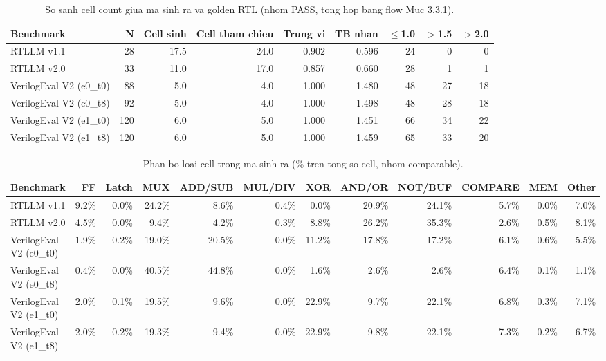 \begin{table}[htbp]
    \centering
    \caption{So sanh cell count giua ma sinh ra va golden RTL (nhom PASS, tong hop bang flow Muc 3.3.1).}
    \label{tab:cell-bloat-summary}
    \begin{tabular}{lrrrrrrrr}
        \toprule
        \textbf{Benchmark} & \textbf{N} & \textbf{Cell sinh} & \textbf{Cell tham chieu} & \textbf{Trung vi} & \textbf{TB nhan} & \textbf{$\leq$1.0} & \textbf{$>$1.5} & \textbf{$>$2.0} \\
        \midrule
        RTLLM v1.1 & 28 & 17.5 & 24.0 & 0.902 & 0.596 & 24 & 0 & 0 \\
        RTLLM v2.0 & 33 & 11.0 & 17.0 & 0.857 & 0.660 & 28 & 1 & 1 \\
        VerilogEval V2 (e0_t0) & 88 & 5.0 & 4.0 & 1.000 & 1.480 & 48 & 27 & 18 \\
        VerilogEval V2 (e0_t8) & 92 & 5.0 & 4.0 & 1.000 & 1.498 & 48 & 28 & 18 \\
        VerilogEval V2 (e1_t0) & 120 & 6.0 & 5.0 & 1.000 & 1.451 & 66 & 34 & 22 \\
        VerilogEval V2 (e1_t8) & 120 & 6.0 & 5.0 & 1.000 & 1.459 & 65 & 33 & 20 \\
        \bottomrule
    \end{tabular}
\end{table}

\begin{table}[htbp]
    \centering
    \caption{Phan bo loai cell trong ma sinh ra (\% tren tong so cell, nhom comparable).}
    \label{tab:cell-type-breakdown}
    \begin{tabular}{lrrrrrrrrrrr}
        \toprule
        \textbf{Benchmark} & \textbf{FF} & \textbf{Latch} & \textbf{MUX} & \textbf{ADD/SUB} & \textbf{MUL/DIV} & \textbf{XOR} & \textbf{AND/OR} & \textbf{NOT/BUF} & \textbf{COMPARE} & \textbf{MEM} & \textbf{Other} \\
        \midrule
        RTLLM v1.1 & 9.2\% & 0.0\% & 24.2\% & 8.6\% & 0.4\% & 0.0\% & 20.9\% & 24.1\% & 5.7\% & 0.0\% & 7.0\% \\
        RTLLM v2.0 & 4.5\% & 0.0\% & 9.4\% & 4.2\% & 0.3\% & 8.8\% & 26.2\% & 35.3\% & 2.6\% & 0.5\% & 8.1\% \\
        VerilogEval V2 (e0_t0) & 1.9\% & 0.2\% & 19.0\% & 20.5\% & 0.0\% & 11.2\% & 17.8\% & 17.2\% & 6.1\% & 0.6\% & 5.5\% \\
        VerilogEval V2 (e0_t8) & 0.4\% & 0.0\% & 40.5\% & 44.8\% & 0.0\% & 1.6\% & 2.6\% & 2.6\% & 6.4\% & 0.1\% & 1.1\% \\
        VerilogEval V2 (e1_t0) & 2.0\% & 0.1\% & 19.5\% & 9.6\% & 0.0\% & 22.9\% & 9.7\% & 22.1\% & 6.8\% & 0.3\% & 7.1\% \\
        VerilogEval V2 (e1_t8) & 2.0\% & 0.2\% & 19.3\% & 9.4\% & 0.0\% & 22.9\% & 9.8\% & 22.1\% & 7.3\% & 0.2\% & 6.7\% \\
        \bottomrule
    \end{tabular}
\end{table}

